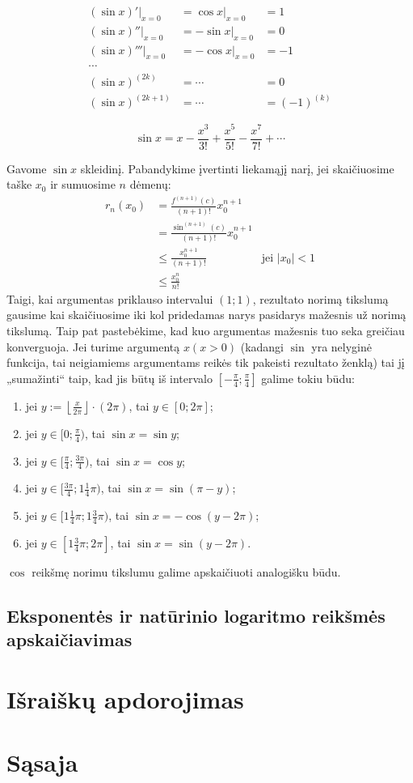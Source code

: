 \begin{align*}
  (\sin x)'|_{x=0} &= \cos x|_{x=0} &= 1 \\
  (\sin x)''|_{x=0} &= -\sin x|_{x=0} &= 0 \\
  (\sin x)''' |_{x=0} &= -\cos x|_{x=0} &= -1 \\
  \cdots \\
  (\sin x)^{(2k)} &= \cdots &= 0 \\
  (\sin x)^{(2k+1)} &= \cdots &= (-1)^{(k)}
\end{align*}

\begin{equation}
  \sin x = x - \frac{x^3}{3!} + \frac{x^5}{5!} - \frac{x^7}{7!} + \cdots
  \label{sin_1}
\end{equation}

Gavome $\sin x$ skleidinį. Pabandykime įvertinti liekamąjį narį, jei
skaičiuosime taške $x_{0}$ ir sumuosime $n$ dėmenų:
\begin{align}
  r_{n}(x_{0}) %
  &= \frac{f^{(n+1)}(c)}{(n+1)!} x_{0}^{n+1} \\
  &= \frac{\sin^{(n+1)}(c)}{(n+1)!} x_{0}^{n+1} \\
  &\leq \frac{x_{0}^{n+1}}{(n+1)!} & \text{jei } |x_{0}| < 1 \\
  &\leq \frac{x_{0}^{n}}{n!} 
\end{align}
Taigi, kai argumentas priklauso intervalui $(1; 1)$, rezultato norimą
tikslumą gausime kai skaičiuosime iki kol pridedamas narys pasidarys
mažesnis už norimą tikslumą. Taip pat pastebėkime, kad kuo argumentas
mažesnis tuo seka greičiau konverguoja. Jei turime argumentą 
$x (x > 0)$ (kadangi $\sin$ yra nelyginė funkcija, tai neigiamiems 
argumentams reikės tik pakeisti rezultato ženklą) tai jį „sumažinti“ 
taip, kad jis būtų iš intervalo $[-\frac{\pi}{4}; \frac{\pi}{4}]$ galime 
tokiu būdu:
\begin{enumerate}
  \item jei $y := \left\lfloor \frac{x}{2\pi} \right\rfloor \cdot (2\pi)$, 
    tai $y \in [0; 2\pi]$;
  \item jei $y \in [0; \frac{\pi}{4})$, tai $\sin x = \sin y$;
  \item jei $y \in [\frac{\pi}{4}; \frac{3\pi}{4})$, tai $\sin x = \cos y$;
  \item jei $y \in [\frac{3\pi}{4}; 1\frac{1}{4}\pi)$, tai 
    $\sin x = \sin (\pi - y)$;
  \item jei $y \in [1\frac{1}{4}\pi; 1\frac{3}{4}\pi)$, tai
    $\sin x = -\cos (y - 2\pi)$;
  \item jei $y \in [1\frac{3}{4}\pi; 2\pi]$, tai
    $\sin x = \sin (y - 2\pi)$.
\end{enumerate}

$\cos$ reikšmę norimu tikslumu galime apskaičiuoti analogišku būdu.

\subsection{Eksponentės ir natūrinio logaritmo reikšmės apskaičiavimas}

\section{Išraiškų apdorojimas}

\section{Sąsaja}

